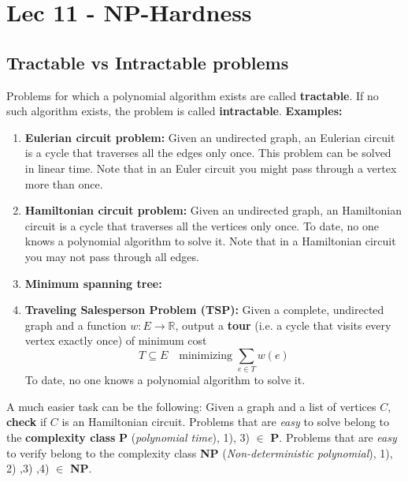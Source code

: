\chapter{Lec 11 - NP-Hardness}

\section{Tractable vs Intractable problems}
Problems for which a polynomial algorithm exists are called \textbf{tractable}. If no such algorithm exists, the problem is called \textbf{intractable}.\newline\newline
\textbf{Examples:}
\begin{enumerate}
    \item \textbf{Eulerian circuit problem:} Given an undirected graph, an Eulerian circuit is a cycle that traverses all the edges only once. This problem can be solved in linear time. Note that in an Euler circuit you might pass through a vertex more than once.

    \item \textbf{Hamiltonian circuit problem:} Given an undirected graph, an Hamiltonian circuit is a cycle that traverses all the vertices only once. To date, no one knows a polynomial algorithm to solve it. Note that in a Hamiltonian circuit you may not pass through all edges.

    \item \textbf{Minimum spanning tree:}

    \item \textbf{Traveling Salesperson Problem (TSP):} Given a complete, undirected graph and a function $w: E \rightarrow \mathbb{R}$, output a \textbf{tour} (i.e. a cycle that visits every vertex exactly once) of minimum cost
    \[T \subseteq E \quad \text{minimizing }\sum_{e \in T}w(e)\]
    To date, no one knows a polynomial algorithm to solve it.
\end{enumerate}
A much easier task can be the following: Given a graph and a list of vertices $C$, \textbf{check} if $C$ is an Hamiltonian circuit.\newline\newline
Problems that are \textit{easy} to solve belong to the \textbf{complexity class} \textbf{P} (\textit{polynomial time}), 1), 3) $\in$ \textbf{P}. Problems that are \textit{easy} to verify belong to the complexity class \textbf{NP} (\textit{Non-deterministic polynomial}), 1), 2) ,3) ,4) $\in$ \textbf{NP}.

